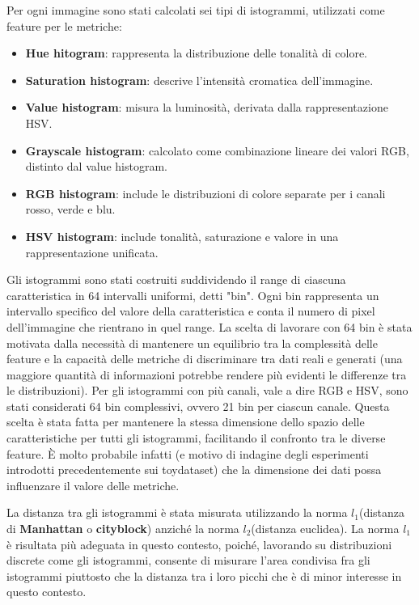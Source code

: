 Per ogni immagine sono stati calcolati sei tipi di istogrammi, utilizzati come feature per le metriche:
\begin{itemize}
    \item \textbf{Hue hitogram}: rappresenta la distribuzione delle tonalità di colore.
    \item \textbf{Saturation histogram}: descrive l'intensità cromatica dell'immagine.
    \item \textbf{Value histogram}: misura la luminosità, derivata dalla rappresentazione HSV.
    \item \textbf{Grayscale histogram}: calcolato come combinazione lineare dei valori RGB, distinto dal value histogram.
    \item \textbf{RGB histogram}: include le distribuzioni di colore separate per i canali rosso, verde e blu.
    \item \textbf{HSV histogram}: include tonalità, saturazione e valore in una rappresentazione unificata.
\end{itemize}
Gli istogrammi sono stati costruiti suddividendo il range di ciascuna caratteristica in 64 intervalli uniformi, detti "bin". Ogni bin rappresenta un intervallo specifico del valore della caratteristica e conta il numero di pixel dell'immagine che rientrano in quel range. La scelta di lavorare con 64 bin è stata motivata dalla necessità di mantenere un equilibrio tra la complessità delle feature e la capacità delle metriche di discriminare tra dati reali e generati (una maggiore quantità di informazioni potrebbe rendere più evidenti le differenze tra le distribuzioni).
Per gli istogrammi con più canali, vale a dire RGB e HSV, sono stati considerati 64 bin complessivi, ovvero 21 bin per ciascun canale. Questa scelta è stata fatta per mantenere la stessa dimensione dello spazio delle caratteristiche per tutti gli istogrammi, facilitando il confronto tra le diverse feature. È molto probabile infatti (e motivo di indagine degli esperimenti introdotti precedentemente sui toydataset) che la dimensione dei dati possa influenzare il valore delle metriche.

La distanza tra gli istogrammi è stata misurata utilizzando la norma \(l_1\)​ (distanza di \textbf{Manhattan} o \textbf{cityblock}) anziché la norma \(l_2\)​ (distanza euclidea). La norma \(l_1\)​ è risultata più adeguata in questo contesto, poiché, lavorando su distribuzioni discrete come gli istogrammi, consente di misurare l'area condivisa fra gli istogrammi piuttosto che la distanza tra i loro picchi che è di minor interesse in questo contesto.

